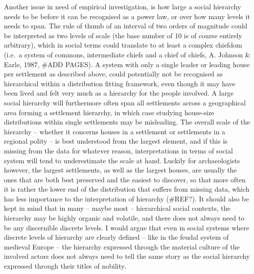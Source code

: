 \documentclass[
  12pt,
]{book}
\begin{document}
Another issue in need of empirical investigation, is how large a social hierarchy needs to be before it can be recognised as a power law, or over how many levels it needs to span. The rule of thumb of an interval of two orders of magnitude could be interpreted as two levels of scale (the base number of 10 is of course entirely arbitrary), which in social terms could translate to at least a complex chiefdom (i.e.~a system of commons, intermediate chiefs and a chief of chiefs, A. Johnson \& Earle, 1987, \#ADD PAGES). A system with only a single leader or leading house per settlement as described above, could potentially not be recognised as hierarchical within a distribution fitting framework, even though it may have been lived and felt very much as a hierarchy for the people involved. A large social hierarchy will furthermore often span all settlements across a geographical area forming a settlement hierarchy, in which case studying house-size distributions within single settlements may be misleading. The overall scale of the hierarchy -- whether it concerns houses in a settlement or settlements in a regional polity -- is best understood from the largest element, and if this is missing from the data for whatever reason, interpretations in terms of social system will tend to underestimate the scale at hand. Luckily for archaeologists however, the largest settlements, as well as the largest houses, are usually the ones that are both best preserved and the easiest to discover, so that more often it is rather the lower end of the distribution that suffers from missing data, which has less importance to the interpretation of hierarchy (\#REF?). It should also be kept in mind that in many -- maybe most -- hierarchical social contexts, the hierarchy may be highly organic and volatile, and there does not always need to be any discernible discrete levels. I would argue that even in social systems where discrete levels of hierarchy are clearly defined -- like in the feudal system of medieval Europe -- the hierarchy expressed through the material culture of the involved actors does not always need to tell the same story as the social hierarchy expressed through their titles of nobility.
\end{document}
